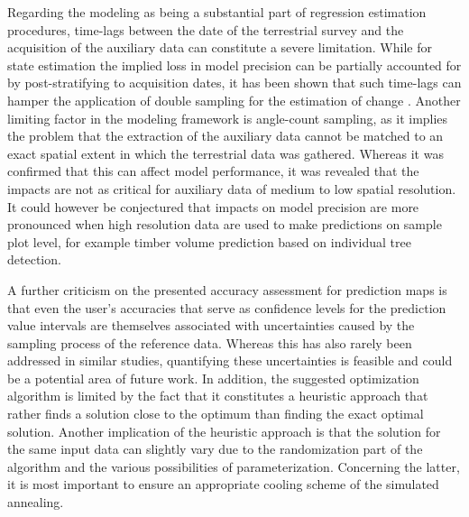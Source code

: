 Regarding the modeling as being a substantial part of regression estimation procedures, time-lags between the date of the terrestrial survey and the acquisition of the auxiliary data can constitute a severe limitation. While for state estimation the implied loss in model precision can be partially accounted for by post-stratifying to acquisition dates, it has been shown that such time-lags can hamper the application of double sampling for the estimation of change \citep{massey2015_thesis}. Another limiting factor in the modeling framework is angle-count sampling, as it implies the problem that the extraction of the auxiliary data cannot be matched to an exact spatial extent in which the terrestrial data was gathered. Whereas it was confirmed that this can affect model performance, it was revealed that the impacts are not as critical for auxiliary data of medium to low spatial resolution. It could however be conjectured that impacts on model precision are more pronounced when high resolution data are used to make predictions on sample plot level, for example timber volume prediction based on individual tree detection.\par

A further criticism on the presented accuracy assessment for prediction maps is that even the user's accuracies that serve as confidence levels for the prediction value intervals are themselves associated with uncertainties caused by the sampling process of the reference data. Whereas this has also rarely been addressed in similar studies, quantifying these uncertainties is feasible and could be a potential area of future work. In addition, the suggested optimization algorithm is limited by the fact that it constitutes a heuristic approach that rather finds a solution close to the optimum than finding the exact optimal solution. Another implication of the heuristic approach is that the solution for the same input data can slightly vary due to the randomization part of the algorithm and the various possibilities of parameterization. Concerning the latter, it is most important to ensure an appropriate cooling scheme of the simulated annealing.

